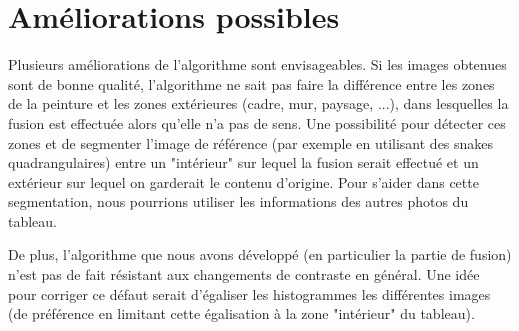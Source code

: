 \documentclass[12pt,a4paper]{article}
\begin{document}
\newpage
\section{Améliorations possibles}

Plusieurs améliorations de l'algorithme sont envisageables. Si les images obtenues sont de bonne qualité, l'algorithme ne sait pas faire la différence entre les zones de la peinture et les zones extérieures (cadre, mur, paysage, ...), dans lesquelles la fusion est effectuée alors qu'elle n'a pas de sens. Une possibilité pour détecter ces zones et de segmenter l'image de référence (par exemple en utilisant des snakes quadrangulaires) entre un "intérieur" sur lequel la fusion serait effectué et un extérieur sur lequel on garderait le contenu d'origine. Pour s'aider dans cette segmentation, nous pourrions utiliser les informations des autres photos du tableau.

De plus, l'algorithme que nous avons développé (en particulier la partie de fusion) n'est pas de fait résistant aux changements de contraste en général. Une idée pour corriger ce défaut serait d'égaliser les histogrammes les différentes images (de préférence en limitant cette égalisation à la zone "intérieur" du tableau).


\end{document}

